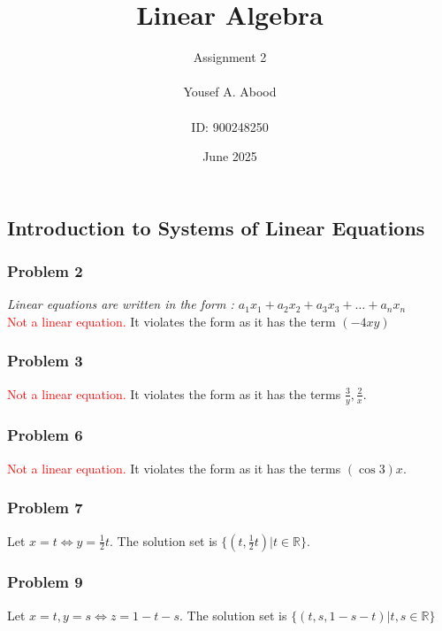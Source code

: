 \documentclass[a4paper,12pt]{article}
\title{Linear Algebra}
\author{Assignment 2\\ \\ Yousef A. Abood\\ \\ ID: 900248250}
\date{June 2025}
\begin{document}
\maketitle
\noindent\makebox[\linewidth]{\rule{15cm}{0.4pt}}
\subsection{Introduction to Systems of Linear Equations}
\subsubsection*{Problem 2}
\textit{Linear equations are written in the form : $a_{1}x_{1}+a_{2}x_{2}+a_{3}x_{3}+ \dots +a_{n}x_{n}$}\\
\textcolor{red}{Not a linear equation.} It violates the form as it has the term $(-4xy)$
\subsubsection*{Problem 3}
\textcolor{red}{Not a linear equation.} It violates the form as it has the terms $\frac{3}{y}, \frac{2}{x}.$
\subsubsection*{Problem 6}
\textcolor{red}{Not a linear equation.} It violates the form as it has the terms $(\cos 3) x.$
\subsubsection*{Problem 7}
Let $x=t \iff y= \frac{1}{2}t.$ The solution set is $\{(t,\frac{1}{2}t)|t \in \mathbb{R}\}$.
\subsubsection*{Problem 9}
Let $x=t, y=s \iff z=1-t-s.$ The solution set is $\{(t,s,1-s-t)|t,s \in \mathbb{R}\}$
\end{document}
